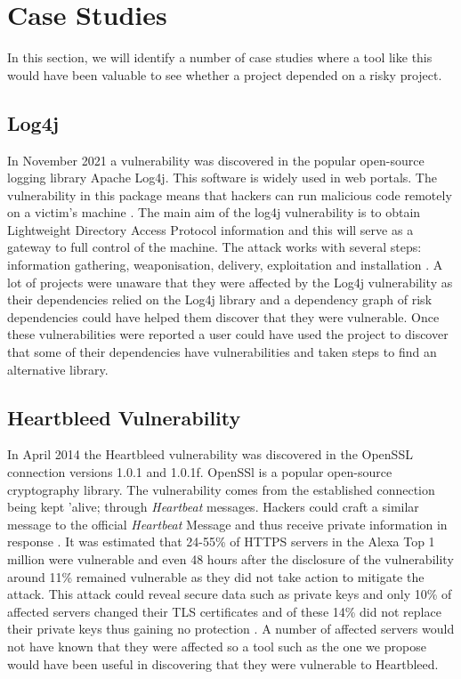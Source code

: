 \documentclass[conference]{IEEEtran}
\begin{document}
{\section{Case Studies}
In this section, we will identify a number of case studies where a tool like this would have been valuable to see whether a project depended on a risky project. 

\subsection{Log4j}
In November 2021 a vulnerability was discovered in the popular open-source logging library Apache Log4j. This software is widely used in web portals. The vulnerability in this package means that hackers can run malicious code remotely on a victim's machine \cite{h_gupta_identification_2022}. The main aim of the log4j vulnerability is to obtain Lightweight Directory Access Protocol information and this will serve as a gateway to full control of the machine. The attack works with several steps: information gathering, weaponisation, delivery, exploitation and installation \cite{f_maulana_unmasking_2023}. A lot of projects were unaware that they were affected by the Log4j vulnerability as their dependencies relied on the Log4j library and a dependency graph of risk dependencies could have helped them discover that they were vulnerable. Once these vulnerabilities were reported a user could have used the project to discover that some of their dependencies have vulnerabilities and taken steps to find an alternative library. 

\subsection{Heartbleed Vulnerability}
In April 2014 the Heartbleed vulnerability was discovered in the OpenSSL connection versions 1.0.1 and 1.0.1f. OpenSSl is a popular open-source cryptography library. The vulnerability comes from the established connection being kept 'alive; through \textit{Heartbeat} messages. Hackers could craft a similar message to the official \textit{Heartbeat} Message and thus receive private information in response \cite{s_kyatam_heartbleed_2017}. It was estimated that 24-55\% of HTTPS servers in the Alexa Top 1 million were vulnerable and even 48 hours after the disclosure of the vulnerability around 11\% remained vulnerable as they did not take action to mitigate the attack. This attack could reveal secure data such as private keys and only 10\% of affected servers changed their TLS certificates and of these 14\% did not replace their private keys thus gaining no protection \cite{durumeric_matter_2014}. A number of affected servers would not have known that they were affected so a tool such as the one we propose would have been useful in discovering that they were vulnerable to Heartbleed. 

}
\end{document}
